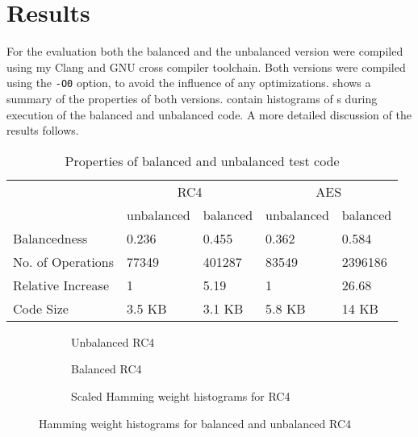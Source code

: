 \chapter{Results}
\label{results}
For the evaluation both the balanced and the unbalanced version were compiled using my Clang and GNU cross compiler toolchain.
Both versions were compiled using the \texttt{-O0} option, to avoid the influence of any optimizations.
 shows a summary of the properties of both versions.
 contain histograms of \hammingw{}s during execution of the balanced and unbalanced code.
A more detailed discussion of the results follows.
  
\begin{table}[h]
  \begin{tabular}{|l|l|l|l|l|}
    \hline
    & \multicolumn{2}{c|}{RC4}  & \multicolumn{2}{c|}{AES} \\
    \cline{2-5}
    & unbalanced & balanced & unbalanced & balanced \\
    \cline{2-5}
    Balancedness      & 0.236 & 0.455 & 0.362  & 0.584 \\
    No. of Operations & 77349 & 401287 & 83549 & 2396186 \\
    Relative Increase & 1 & 5.19 & 1 & 26.68 \\
    Code Size            & 3.5 KB & 3.1 KB & 5.8 KB & 14 KB \\
    \hline
  \end{tabular}
  \caption{Properties of balanced and unbalanced test code}
  \label{tbl:properties}
\end{table}

\begin{figure}[hp]
  \centering
  \begin{subfigure}[b]{0.49\textwidth}
    
    \caption{Unbalanced RC4}
  \end{subfigure}
  \begin{subfigure}[b]{0.49\textwidth}
    
    \caption{Balanced RC4}
  \end{subfigure}

  \begin{subfigure}[b]{\textwidth}
    
    \caption{Scaled Hamming weight histograms for RC4}
  \end{subfigure}
  \caption{Hamming weight histograms for balanced and unbalanced RC4}
  \label{fig:rc4}
\end{figure}


